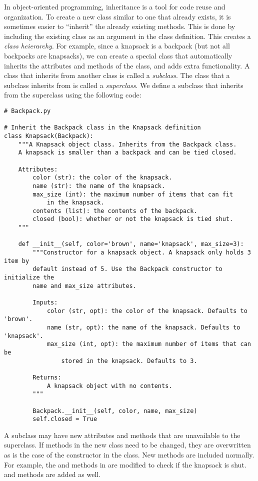 In object-oriented programming, inheritance is a tool for code reuse and organization.
To create a new class similar to one that already exists, it is sometimes easier to ``inherit'' the already existing methods.
This is done by including the existing class as an argument in the class definition.
This creates a \emph{class heierarchy}.
For example, since a knapsack is a backpack (but not all backpacks are knapsacks), we can create a special  class that automatically inherits the attributes and methods of the  class, and adds extra functionality.
A class that inherits from another class is called a \emph{subclass}.
The class that a subclass inherits from is called a \emph{superclass}.
We define a  subclass that inherits from the  superclass using the following code:

\begin{lstlisting}
# Backpack.py

# Inherit the Backpack class in the Knapsack definition
class Knapsack(Backpack):
    """A Knapsack object class. Inherits from the Backpack class.
    A knapsack is smaller than a backpack and can be tied closed.
    
    Attributes:
        color (str): the color of the knapsack.
        name (str): the name of the knapsack.
        max_size (int): the maximum number of items that can fit
            in the knapsack.
        contents (list): the contents of the backpack.
        closed (bool): whether or not the knapsack is tied shut.
    """
    
    def __init__(self, color='brown', name='knapsack', max_size=3):
        """Constructor for a knapsack object. A knapsack only holds 3 item by
        default instead of 5. Use the Backpack constructor to initialize the
        name and max_size attributes.
        
        Inputs:
            color (str, opt): the color of the knapsack. Defaults to 'brown'.
            name (str, opt): the name of the knapsack. Defaults to 'knapsack'.
            max_size (int, opt): the maximum number of items that can be
                stored in the knapsack. Defaults to 3.
        
        Returns:
            A knapsack object with no contents.
        """
        
        Backpack.__init__(self, color, name, max_size)
        self.closed = True
\end{lstlisting}

A subclass may have new attributes and methods that are unavailable to the superclass.
If methods in the new class need to be changed, they are overwritten as is the case of the constructor in the  class.
New methods are included normally.
For example, the  and  methods in  are modified to check if the knapsack is shut. 
 and  methods are added as well.

